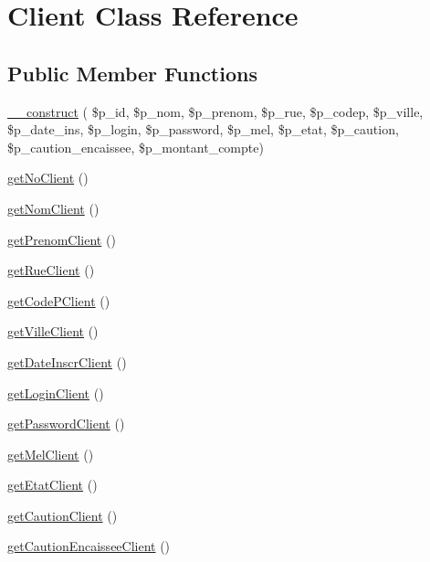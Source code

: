 \hypertarget{class_client}{}\section{Client Class Reference}
\label{class_client}
\subsection*{Public Member Functions}
\begin{DoxyCompactItemize}
\item 
\hyperlink{class_client_ad96ff90693d0dc40dbfee37bed59019e}{\+\_\+\+\_\+construct} ( \$p\+\_\+id, \$p\+\_\+nom, \$p\+\_\+prenom, \$p\+\_\+rue, \$p\+\_\+codep, \$p\+\_\+ville, \$p\+\_\+date\+\_\+ins, \$p\+\_\+login, \$p\+\_\+password, \$p\+\_\+mel, \$p\+\_\+etat, \$p\+\_\+caution, \$p\+\_\+caution\+\_\+encaissee, \$p\+\_\+montant\+\_\+compte)
\item 
\hyperlink{class_client_aa1421f4c633c8b54d15564a0e1639910}{get\+No\+Client} ()
\item 
\hyperlink{class_client_aedb289529f155ec710a5ba56ca9b4aac}{get\+Nom\+Client} ()
\item 
\hyperlink{class_client_a2d704dcd57b25d7f08fbb2958dcfb9e5}{get\+Prenom\+Client} ()
\item 
\hyperlink{class_client_a5be4509d3fc4544cb071c916271faba8}{get\+Rue\+Client} ()
\item 
\hyperlink{class_client_a9c6abbe6ff021062bf8387438ca4f6ad}{get\+Code\+P\+Client} ()
\item 
\hyperlink{class_client_ab607203fb73662682b0eb68151842ef4}{get\+Ville\+Client} ()
\item 
\hyperlink{class_client_afd5f076c85b2f8f69204215429a51aab}{get\+Date\+Inscr\+Client} ()
\item 
\hyperlink{class_client_ab90a68e85f0d082e565e499d94e74f7e}{get\+Login\+Client} ()
\item 
\hyperlink{class_client_a74d3b4554f5091a5feb275e053cf5ef0}{get\+Password\+Client} ()
\item 
\hyperlink{class_client_afd1fd9d824c0076519669b6fb6501413}{get\+Mel\+Client} ()
\item 
\hyperlink{class_client_a7658c4be9316977f4d23695e735b219a}{get\+Etat\+Client} ()
\item 
\hyperlink{class_client_afa5984ee7b2e06b717a27ec545fd7541}{get\+Caution\+Client} ()
\item 
\hyperlink{class_client_a58ff00393a8812abb3bca76ad4ec772a}{get\+Caution\+Encaissee\+Client} ()

\end{DoxyCompactItemize}
